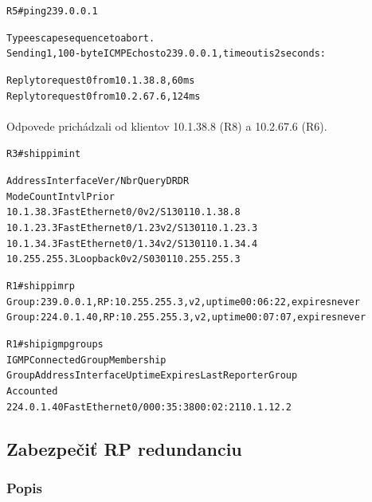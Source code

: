 \documentclass[12pt,twoside,a4paper]{report}
\begin{document}
\noindent
{\selectfont
\begin{small}
\begin{alltt}
R5#ping 239.0.0.1

Type escape sequence to abort.
Sending 1, 100-byte ICMP Echos to 239.0.0.1, timeout is 2 seconds:

Reply to request 0 from 10.1.38.8, 60 ms
Reply to request 0 from 10.2.67.6, 124 ms
\end{alltt}
\end{small}
}

\paragraph{}
Odpovede prichádzali od klientov 10.1.38.8 (R8) a 10.2.67.6 (R6).

\noindent
{\selectfont
\begin{small}
\begin{alltt}

R3#sh ip pim int

Address          Interface            Ver/   Nbr    Query  DR     DR
                                      Mode   Count  Intvl  Prior
10.1.38.3        FastEthernet0/0      v2/S   1      30     1      10.1.38.8
10.1.23.3        FastEthernet0/1.23   v2/S   1      30     1      10.1.23.3
10.1.34.3        FastEthernet0/1.34   v2/S   1      30     1      10.1.34.4
10.255.255.3     Loopback0            v2/S   0      30     1      10.255.255.3

R1#sh ip pim rp    
Group: 239.0.0.1, RP: 10.255.255.3, v2, uptime 00:06:22, expires never
Group: 224.0.1.40, RP: 10.255.255.3, v2, uptime 00:07:07, expires never


R1#sh ip igmp groups
IGMP Connected Group Membership
Group Address  Interface         Uptime    Expires   Last Reporter   Group
                                                                     Accounted
224.0.1.40     FastEthernet0/0   00:35:38  00:02:21  10.1.12.2

\end{alltt}
\end{small}
}


\subsection{Zabezpečiť RP redundanciu}
\subsubsection{Popis}
\end{document}
